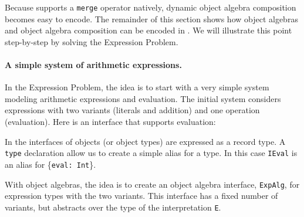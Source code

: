 Because \name supports a \lstinline{merge} operator natively, dynamic
object algebra composition becomes easy to encode. The remainder of
this section shows how object algebras and object algebra composition
can be encoded in \name. We will illustrate this point
step-by-step by solving the Expression Problem.


\paragraph{A simple system of arithmetic expressions.}
In the Expression Problem, the idea is to start with a very simple
system modeling arithmetic expressions and evaluation.
The initial system considers expressions with two variants (literals and
addition) and one operation (evaluation). Here is an interface that supports
evaluation:
\begin{comment}
  \begin{lstlisting}{language=F2J}
    type IEval = {eval: Int};
  \end{lstlisting}
\end{comment}

\noindent In \name the interfaces of objects (or object types) are expressed as
a record type. A \lstinline{type} declaration allow us to create a
simple alias for a type.  In this case \lstinline{IEval} is an alias
for \{\lstinline{eval: Int}\}.

With object algebras, the idea is to create an object algebra
interface, \lstinline$ExpAlg$, for expression types with the two
variants. This interface has a fixed number of variants, but abstracts over the
type of the interpretation \lstinline$E$.

\begin{comment}
  \begin{lstlisting}{language=F2J}
    type ExpAlg[E] = {
      lit: Int -> E,
      add: E -> E -> E
    };
  \end{lstlisting}
\end{comment}



